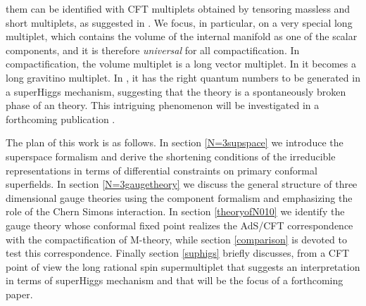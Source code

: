 \documentclass[a4paper,12pt]{article}
\providecommand{\ft}[2]{{\textstyle\frac{#1}{#2}}}
\def\n010{N^{0,1,0}}
\begin{document}
them can be identified with CFT multiplets obtained by tensoring
massless and short multiplets, as suggested in \cite{sergiotorino}.
We focus, in particular, on a very special long multiplet, which
contains the volume of the internal manifold as one of the scalar
components, and it is therefore {\it universal} for all compactification.
In \coordHE{} compactification, the volume multiplet is a long
vector multiplet.
In \coordHE{} it becomes a long gravitino multiplet.
In \myHighlight{$\n010$}\coordHE{}, it has the right quantum numbers to be generated in a
superHiggs mechanism,  suggesting that the theory is a spontaneously
broken phase of an \coordHE{} theory.
This intriguing phenomenon will be investigated in a forthcoming
publication \cite{noinext}.
\par
The plan of this work is as follows.
In section \ref{N=3supspace} we introduce the \coordHE{}
superspace formalism and derive the shortening conditions of
the \coordHE{} irreducible representations in terms of
differential constraints on primary conformal superfields.
In section \ref{N=3gaugetheory} we discuss the general structure of
\coordHE{} three dimensional gauge theories using the component
formalism and emphasizing the role of the Chern Simons interaction.
In section \ref{theoryofN010} we identify the \coordHE{} gauge
theory whose conformal fixed point realizes the AdS/CFT correspondence
with the \myHighlight{$\n010$}\coordHE{} compactification of M-theory, while section
\ref{comparison} is devoted to test this correspondence.
Finally section \ref{suphigs} briefly discusses, from a CFT point of
view the long rational spin \myHighlight{$\ft 32$}\coordHE{} supermultiplet that suggests an
interpretation in terms of superHiggs mechanism and that will be the
focus of a forthcoming paper.
\end{document}
